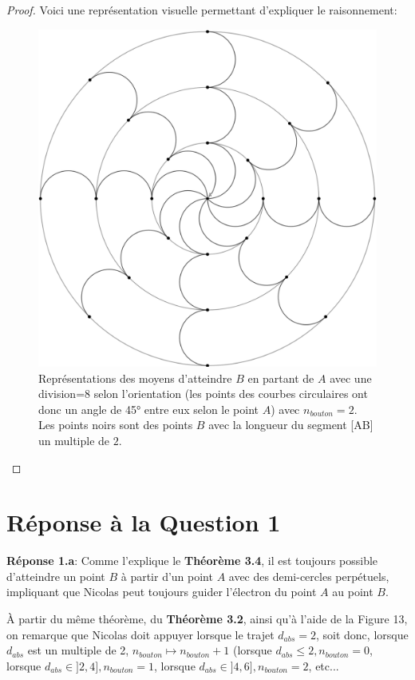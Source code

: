 \documentclass[a4paper]{amsart}
\theoremstyle{definition}
\theoremstyle{remark}
\numberwithin{equation}{section}
\begin{document}
\begin{proof}
  Voici une représentation visuelle permettant d'expliquer le raisonnement:
  \begin{figure}[H]
    \centering
    \includegraphics[scale=0.27]{images/visualization.png}
    \caption{Représentations des moyens d'atteindre $B$ en partant de $A$ avec une division=8 selon l'orientation (les points des courbes circulaires ont donc un angle de 45° entre eux selon le point $A$) avec $n_{bouton}=2$.
      Les points noirs sont des points $B$ avec la longueur du segment [AB] un multiple de $2$.}
  \end{figure}
\end{proof}

\section{Réponse à la Question 1}

\textbf{Réponse 1.a}: Comme l'explique le \textbf{Théorème 3.4}, il est toujours possible d'atteindre un point $B$ à partir d'un point $A$ avec des demi-cercles perpétuels, impliquant que Nicolas peut toujours guider l'électron du point $A$ au point $B$.

À partir du même théorème, du \textbf{Théorème 3.2}, ainsi qu'à l'aide de la Figure 13, on remarque que Nicolas doit appuyer lorsque le trajet $d_{abs}=2$, soit donc, lorsque $d_{abs}$ est un multiple de 2, $n_{bouton}\longmapsto n_{bouton}+1$ (lorsque $d_{abs}\leq2, n_{bouton}=0$, lorsque $d_{abs}\in]2,4], n_{bouton}=1$, lorsque $d_{abs}\in]4,6], n_{bouton}=2$, etc...
\end{document}
